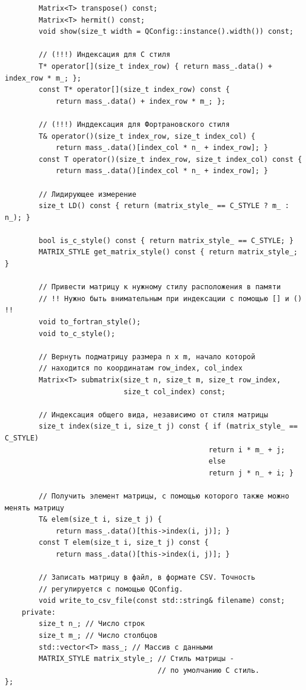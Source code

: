 \documentclass[12pt,fleqn]{article}
\begin{document}
\begin{mdframed}[linecolor=black, topline=true, bottomline=true,
                leftline=false, rightline=false]
\begin{verbatim}
        Matrix<T> transpose() const;
        Matrix<T> hermit() const;
        void show(size_t width = QConfig::instance().width()) const;
    
        // (!!!) Индексация для С стиля
        T* operator[](size_t index_row) { return mass_.data() + index_row * m_; }; 
        const T* operator[](size_t index_row) const { 
            return mass_.data() + index_row * m_; };
    
        // (!!!) Инддексация для Фортрановского стиля
        T& operator()(size_t index_row, size_t index_col) { 
            return mass_.data()[index_col * n_ + index_row]; }
        const T operator()(size_t index_row, size_t index_col) const { 
            return mass_.data()[index_col * n_ + index_row]; }
    
        // Лидирующее измерение
        size_t LD() const { return (matrix_style_ == C_STYLE ? m_ : n_); }

        bool is_c_style() const { return matrix_style_ == C_STYLE; }
        MATRIX_STYLE get_matrix_style() const { return matrix_style_; }

        // Привести матрицу к нужному стилу расположения в памяти
        // !! Нужно быть внимательным при индексации с помощью [] и () !!
        void to_fortran_style();
        void to_c_style();

        // Вернуть подматрицу размера n x m, начало которой 
        // находится по координатам row_index, col_index
        Matrix<T> submatrix(size_t n, size_t m, size_t row_index, 
                            size_t col_index) const;

        // Индексация общего вида, независимо от стиля матрицы
        size_t index(size_t i, size_t j) const { if (matrix_style_ == C_STYLE) 
                                                return i * m_ + j; 
                                                else 
                                                return j * n_ + i; }

        // Получить элемент матрицы, с помощью которого также можно менять матрицу
        T& elem(size_t i, size_t j) { 
            return mass_.data()[this->index(i, j)]; }
        const T elem(size_t i, size_t j) const { 
            return mass_.data()[this->index(i, j)]; }

        // Записать матрицу в файл, в формате CSV. Точность 
        // регулируется с помощью QConfig.
        void write_to_csv_file(const std::string& filename) const;
    private:
        size_t n_; // Число строк
        size_t m_; // Число столбцов
        std::vector<T> mass_; // Массив с данными
        MATRIX_STYLE matrix_style_; // Стиль матрицы - 
                                    // по умолчанию С стиль.
};
            \end{verbatim}
            \end{mdframed}
\end{document}
